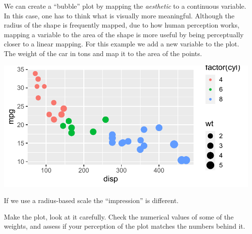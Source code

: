 \documentclass[krantz2]{krantz}\usepackage{knitr}
\begin{document}
We can create a ``bubble'' plot by mapping the  \emph{aesthetic} to a continuous variable. In this case, one has to think what is visually more meaningful. Although the radius of the shape is frequently mapped, due to how human perception works, mapping a variable to the area of the shape is more useful by being perceptually closer to a linear mapping. For this example we add a new variable to the plot. The weight of the car in tons and map it to the area of the points.

\begin{knitrout}\footnotesize
{}\color{fgcolor}\begin{kframe}
\begin{alltt}
\hlstd{(}  \hlstd{(}   
                           \hlstd{=} 
                            \hlopt{+}
  \hlstd{()} \hlopt{+}
  \hlstd{()}
\end{alltt}
\end{kframe}

{\centering \includegraphics[width=.7\textwidth]{figure/pos-scatter-16-1} 

}



\end{knitrout}

\begin{playground}
If we use a radius-based scale the ``impression'' is different.

\begin{knitrout}\footnotesize
{}\color{fgcolor}\begin{kframe}
\begin{alltt}
\hlstd{(}  \hlstd{(}   
                           \hlstd{=} 
                            \hlopt{+}
  \hlstd{()} \hlopt{+}
  \hlstd{()}
\end{alltt}
\end{kframe}
\end{knitrout}

Make the plot, look at it carefully. Check the numerical values of some of the weights, and assess if your perception of the plot matches the numbers behind it.
\end{playground}
\end{document}
